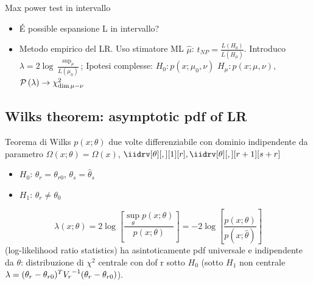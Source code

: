 \documentclass[asd-beamer.tex]{subfiles}
\begin{document}
\begin{wordonframe}{Max power test in intervallo}
\begin{itemize}
\item \'E possible espansione L in intervallo?
\item Metodo empirico del LR. Uso stimatore ML $\hat{\mu}$: $t_{NP}=\frac{L(H_0)}{L(H_{\mu})}$. Introduco $\lambda=2\log{\frac{\sup_{\mu}}{L(\mu_0)}}$; Ipotesi complesse: $H_0: p(x;\mu_0,\nu)$ $H_{\mu}: p(x;\mu,\nu)$, $\operatorname{\mathcal{P}}{(\lambda)}\to \chi^2_{\dim{\mu-\nu}}$
\end{itemize}
\end{wordonframe}

\subsection{Wilks theorem: asymptotic pdf of LR}

\begin{frame}{Teorema di Wilks}\frameintoc
	$p(x;\theta)$ due volte differenziabile con dominio indipendente da parametro $\Omega(x;\theta)=\Omega(x)$, $\iidrv[\theta][,][1][r],\iidrv[\theta][,][r+1][s+r]$
	\begin{itemize}
		\item $H_0$: $\theta_r=\theta_{r0}$, $\theta_s=\hat{\theta}_s$
		\item $H_1$: $\theta_r\neq\theta_0$
	\end{itemize}
	\[\lambda(x;\theta)=2\log{[\frac{\sup_{\theta}{p(x;\theta)}}{p(x;\theta)}]}=-2\log{[\frac{p(x;\theta)}{p(x;\hat{\theta})}]}\] (log-likelihood ratio statistics) ha asintoticamente pdf universale e indipendente da $\theta$: distribuzione di $\chi^2$ centrale con dof r sotto $H_0$ (sotto $H_1$ non centrale $\lambda=(\theta_r-\theta_{r0})^T{V_r}^{-1}(\theta_r-\theta_{r0})$).
\end{frame}
\end{document}
